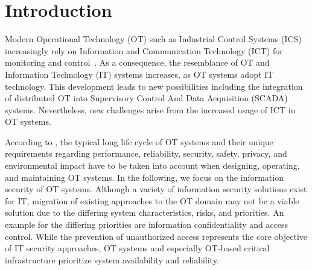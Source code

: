 \chapter{Introduction}
\label{ch:introduction}
Modern Operational Technology (OT) such as Industrial Control Systems (ICS) increasingly rely on Information and Communication Technology (ICT) for monitoring and control~\cite{Stouffer2023}.
As a consequence, the resemblance of OT and Information Technology (IT) systems increases, as OT systems adopt IT technology.
This development leads to new possibilities including the integration of distributed OT into Supervisory Control And Data Acquisition (SCADA) systems.
Nevertheless, new challenges arise from the increased usage of ICT in OT systems.

According to \citeauthor{Stouffer2023} \cite{Stouffer2023}, the typical long life cycle of OT systems and their unique requirements regarding performance, reliability, security, safety, privacy, and environmental impact have to be taken into account when designing, operating, and maintaining OT systems.
In the following, we focus on the information security of OT systems.
Although a variety of information security solutions exist for IT, migration of existing approaches to the OT domain may not be a viable solution due to the differing system characteristics, risks, and priorities.
An example for the differing priorities are information confidentiality and access control.
While the prevention of unauthorized access represents the core objective of IT security approaches, OT systems and especially OT-based critical infrastructure prioritize system availability and reliability.

